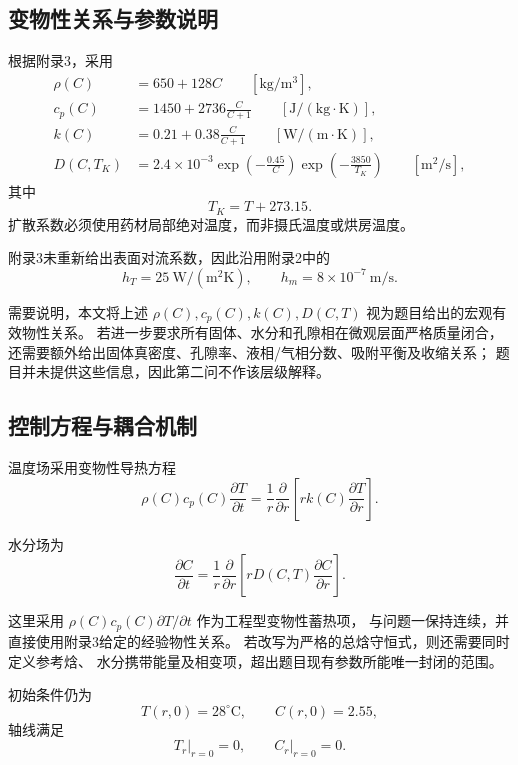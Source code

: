 \documentclass[UTF8,a4paper,11pt]{ctexart}
\begin{document}
\subsection{变物性关系与参数说明}

根据附录3，采用
\begin{align}
\rho(C)&=650+128C
\qquad [\mathrm{kg/m^3}],\\
c_p(C)&=1450+2736\frac{C}{C+1}
\qquad [\mathrm{J/(kg\cdot K)}],\\
k(C)&=0.21+0.38\frac{C}{C+1}
\qquad [\mathrm{W/(m\cdot K)}],\\
D(C,T_K)
&=
2.4\times10^{-3}
\exp\left(-\frac{0.45}{C}\right)
\exp\left(-\frac{3850}{T_K}\right)
\qquad [\mathrm{m^2/s}],
\end{align}
其中
\[
T_K=T+273.15.
\]
扩散系数必须使用药材局部绝对温度，而非摄氏温度或烘房温度。

附录3未重新给出表面对流系数，因此沿用附录2中的
\[
h_T=25~\mathrm{W/(m^2K)},
\qquad
h_m=8\times10^{-7}~\mathrm{m/s}.
\]

需要说明，本文将上述 $\rho(C),c_p(C),k(C),D(C,T)$
视为题目给出的宏观有效物性关系。
若进一步要求所有固体、水分和孔隙相在微观层面严格质量闭合，
还需要额外给出固体真密度、孔隙率、液相/气相分数、吸附平衡及收缩关系；
题目并未提供这些信息，因此第二问不作该层级解释。

\subsection{控制方程与耦合机制}

温度场采用变物性导热方程
\begin{equation}
\boxed{
\rho(C)c_p(C)\frac{\partial T}{\partial t}
=
\frac1r\frac{\partial}{\partial r}
\left[
rk(C)\frac{\partial T}{\partial r}
\right]
}.
\label{eq:q2_heat}
\end{equation}

水分场为
\begin{equation}
\boxed{
\frac{\partial C}{\partial t}
=
\frac1r\frac{\partial}{\partial r}
\left[
rD(C,T)\frac{\partial C}{\partial r}
\right]
}.
\label{eq:q2_mass}
\end{equation}

这里采用 $\rho(C)c_p(C)\partial T/\partial t$ 作为工程型变物性蓄热项，
与问题一保持连续，并直接使用附录3给定的经验物性关系。
若改写为严格的总焓守恒式，则还需要同时定义参考焓、
水分携带能量及相变项，超出题目现有参数所能唯一封闭的范围。

初始条件仍为
\[
T(r,0)=28^\circ\mathrm C,\qquad C(r,0)=2.55,
\]
轴线满足
\[
\left.T_r\right|_{r=0}=0,\qquad
\left.C_r\right|_{r=0}=0.
\]
\end{document}
